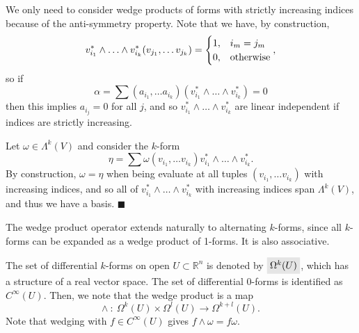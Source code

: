 \documentclass[letter-paper]{tufte-book}
\newenvironment{proof}[1][Proof]{\begin{trivlist}
\item[\hskip \labelsep {\bfseries #1}]}{\end{trivlist}}
\newcommand{\qed}{\hfill$\blacksquare$}
\newcommand{\highlight}[1]{\mathchoice%
  {\colorbox{black!10}{$\displaystyle#1$}}%
  {\colorbox{black!10}{$\textstyle#1$}}%
  {\colorbox{black!10}{$\scriptstyle#1$}}%
  {\colorbox{black!10}{$\scriptscriptstyle#1$}}}%
\begin{document}
\begin{proof}
  We only need to consider wedge products of forms with strictly increasing indices because of the anti-symmetry property. Note that we have, by construction,
  \begin{equation*}
    v_{i_1}^* \wedge \ldots \wedge v_{i_k}^* (v_{j_1}, \ldots v_{j_k}) = \begin{cases}1, & i_m = j_m \\ 0, & \textnormal{otherwise}\end{cases},
  \end{equation*}
  so if
  \begin{equation*}
    \alpha = \sum (a_{i_1},\ldots a_{i_k})(v_{i_1}^* \wedge \ldots \wedge v_{i_k}^*) = 0
  \end{equation*}
  then this implies $a_{i_j} = 0$ for all $j$, and so $v_{i_1}^* \wedge \ldots \wedge v_{i_k}^*$ are linear independent if indices are strictly increasing.
  
  Let $\omega \in \Lambda^k(V)$ and consider the $k$-form
  \begin{equation*}
    \eta = \sum \omega(v_{i_1}, \ldots v_{i_k}) v_{i_1}^* \wedge \ldots \wedge v_{i_k}^*.
  \end{equation*}
  By construction, $\omega = \eta$ when being evaluate at all tuples $(v_{i_1}, \ldots v_{i_k})$ with increasing indices, and so all of $v_{i_1}^* \wedge \ldots \wedge v_{i_k}^*$ with increasing indices span $\Lambda^k(V)$, and thus we have a basis. \qed
\end{proof}

The wedge product operator extends naturally to alternating $k$-forms, since all $k$-forms can be expanded as a wedge product of 1-forms. It is also associative.

The set of differential $k$-forms on open $U\subset \mathbb{R}^n$ is denoted by $\highlight{\Omega^k(U)}$, which has a structure of a real vector space. The set of differential 0-forms is identified as $C^\infty(U)$. Then, we note that the wedge product is a map
\begin{equation}
  \wedge\ :\ \Omega^k(U) \times \Omega^l(U) \to \Omega^{k+l}(U).
\end{equation}
Note that wedging with $f\in C^\infty(U)$ gives $f\wedge \omega = f\omega$.
\end{document}
